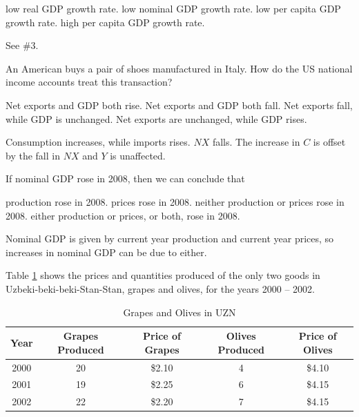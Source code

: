 \documentclass[addpoints,11pt]{exam}
\theoremstyle{definition}
\begin{document}
\begin{questions}
	\begin{choices}
		\choice low real GDP growth rate.
		\choice low nominal GDP growth rate.
		\choice low per capita GDP growth rate.
		\CorrectChoice high per capita GDP growth rate.
	\end{choices}
	
		\begin{solution}
			See \#3.
		\end{solution}
		
		\question An American buys a pair of shoes manufactured in Italy. How do the US national income accounts treat this transaction?
		
		\begin{choices}
			\choice Net exports and GDP both rise.
			\choice Net exports and GDP both fall.
			\CorrectChoice Net exports fall, while GDP is unchanged.
			\choice Net exports are unchanged, while GDP rises.
		\end{choices}
		
		\begin{solution}
			Consumption increases, while imports rises. $NX$ falls. The increase in $C$ is offset by the fall in $NX$ and $Y$ is unaffected.
		\end{solution}
		
		\question If nominal GDP rose in 2008, then we can conclude that 
		
		\begin{choices}
			\choice production rose in 2008.
			\choice prices rose in 2008.
			\choice neither production or prices rose in 2008.
			\CorrectChoice either production or prices, or both, rose in 2008.
		\end{choices}
		
		\begin{solution}
			Nominal GDP is given by current year production and current year prices, so increases in nominal GDP can be due to either.
		\end{solution}
		
		\question Table \ref{MC23} shows the prices and quantities produced of the only two goods in Uzbeki-beki-beki-Stan-Stan, grapes and olives, for the years 2000 -- 2002.
		
		\begin{table}[h]
			\caption{Grapes and Olives in UZN}
			\centering
			\begin{tabular}{c|c|c|c|c}
				Year & Grapes Produced & Price of Grapes & Olives Produced & Price of Olives \\
				\hline
				2000 & 20 & \$2.10 & 4 & \$4.10\\
				2001 & 19 & \$2.25 & 6 & \$4.15\\
				2002 & 22 & \$2.20 & 7 & \$4.15\\
			\end{tabular} 
			\label{MC23}
		\end{table}
		

\end{questions}
\end{document}
